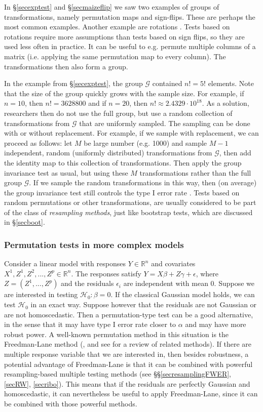 \documentclass[11pt]{article}
\theoremstyle{plain}
\theoremstyle{definition}
\newcommand{\reals}{\mathbb{R}}
\newcommand{\G}{\mathcal{G}}
\newcommand{\Hy}{\mathcal{H}}
\newcommand{\citp}{\citep}
\begin{document}
In \S\ref{secexptest} and \S\ref{secmaizeflip} we saw two examples of groups of transformations, namely permutation maps and sign-flips. These are perhaps the most common examples. Another example are rotations \citp{solari2014rotation,koning2024more}. Tests based on rotations require more assumptions than tests based on sign flips, so they are used less often in practice. It  can be useful to e.g. permute multiple columns of a matrix (i.e. applying the same permutation map to every column). The transformations then also form a group.

In the example from \S\ref{secexptest}, the group $\G$ contained $n!=5!$ elements. Note that the size of the group quickly grows with the sample size. For example, if $n=10$, then $n!=3628800$ and if $n=20$, then $n!\approx 2.4329\cdot 10^{18}$. As a solution, researchers then do not use the full group, but use a random collection of transformations from $\G$ that are uniformly sampled. The sampling can be done with or without replacement. For example, if we sample with replacement, we can proceed as follows: let $M$ be large number (e.g. 1000) and sample $M-1$ independent, random (uniformly distributed) transformations from $\G$, then add the identity map to this collection of transformations.
Then apply the group invariance test as usual, but using these $M$ transformations rather than the full group $\G$.
If we sample the random transformations in this way, then (on average) the group invariance test still controls the type I error rate \citp{hemerik2018exact}. Tests based on random permutations or other transformations, are usually considered to be  part of the class of \emph{resampling methods}, just like bootstrap tests, which are discussed in \S\ref{secboot}.


\subsubsection{Permutation tests in more complex models} \label{secpermcompl}

Consider a linear model with responses $Y\in \reals^n$ and covariates $X^1,Z^1,Z^2,...,Z^p\in\reals^n$. The responses satisfy $Y= X \beta +Z\gamma +\epsilon$, where $Z=(Z^1,...,Z^p)$ and the residuals $\epsilon_i$ are independent with mean 0. Suppose we are interested in testing  $\Hy_0:\beta=0$.  If the classical Gaussian model holds, we can test $\Hy_0$ in an exact way. Suppose however that the residuals are not Gaussian or are not homoscedastic. Then a permutation-type test can be a good alternative, in the sense that it may have type I error rate closer to $\alpha$ and may have more robust power. A well-known permutation method in this situation is the Freedman-Lane method (\citealp{freedman1983nonstochastic}, and see \citealp{winkler2014permutation} for a review of related methods). If there are multiple response variable that we are interested in, then besides robustness, a potential advantage of Freedman-Lane is that it can be combined with powerful resampling-based multiple testing methods (see \S\S\ref{secresamplingFWER}, \ref{secRW}, \ref{secribo}). This means that if the residuals are perfectly Gaussian and homoscedastic, it can nevertheless be useful to apply  Freedman-Lane, since it can be combined with those powerful methods.
\end{document}
